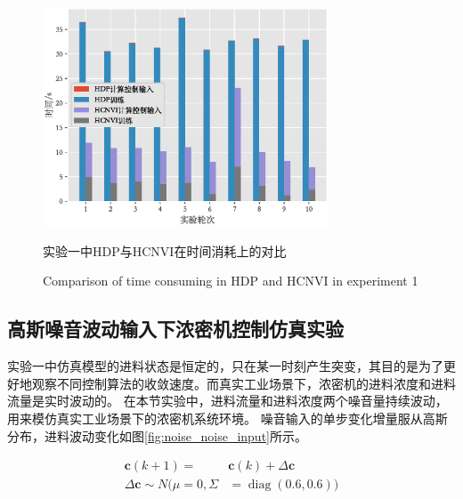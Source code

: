 \begin{figure}[hpbt]
    \centering
    \includegraphics[width=8.5cm]{figures/chapter6/fig9.eps}
    \caption{实验一中HDP与HCNVI在时间消耗上的对比 }

  \addtocounter{figure}{-1}
  \vspace{-5pt}
  \renewcommand{\figurename}{Fig.}
  \caption{Comparison of time consuming in HDP and HCNVI in experiment 1}
  \renewcommand{\figurename}{图}

    \label{fig:stable_time_cmp}
\end{figure}

\subsection{高斯噪音波动输入下浓密机控制仿真实验}
\label{sec:vi_hdp_noise}
实验一中仿真模型的进料状态是恒定的，只在某一时刻产生突变，其目的是为了更好地观察不同控制算法的收敛速度。而真实工业场景下，浓密机的进料浓度和进料流量是实时波动的。
在本节实验中，进料流量和进料浓度两个噪音量持续波动，用来模仿真实工业场景下的浓密机系统环境。
噪音输入的单步变化增量服从高斯分布，进料波动变化如图\ref{fig:noise_noise_input}所示。

\begin{equation}
\begin{split}
 \label{equ:noise_c_disturbance}
 \pmb c(k+1) =&\pmb c(k)+\Delta \pmb c \\
 \Delta \pmb c \sim N(\mu=0 ,
\Sigma&=\operatorname{diag}(0.6,0.6))
\end{split}
\end{equation}

